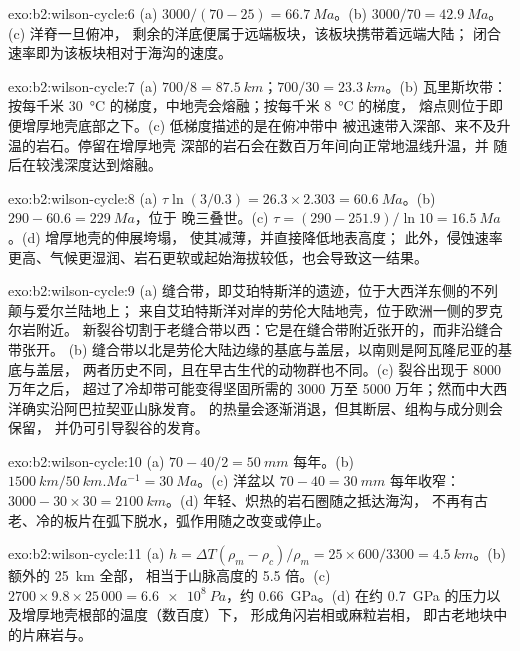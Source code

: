 \begin{solution}{exo:b2:wilson-cycle:6}
(a) $3000/(70 - 25) = \qty{66.7}{Ma}$。(b) $3000/70 = \qty{42.9}{Ma}$。(c) 洋脊一旦俯冲，
剩余的洋底便属于远端板块，该板块携带着远端大陆；
闭合速率即为该板块相对于海沟的速度。
\end{solution}

\begin{solution}{exo:b2:wilson-cycle:7}
(a) $700/8 = \qty{87.5}{km}$；$700/30 = \qty{23.3}{km}$。(b) 瓦里斯坎带：
按每千米 \qty{30}{\celsius} 的梯度，中地壳会熔融；按每千米 \qty{8}{\celsius} 的梯度，
熔点则位于即便增厚地壳底部之下。(c) 低梯度描述的是在俯冲带中
被迅速带入深部、来不及升温的岩石。停留在增厚地壳
深部的岩石会在数百万年间向正常地温线升温，并
随后在较浅深度达到熔融。
\end{solution}

\begin{solution}{exo:b2:wilson-cycle:8}
(a) $\tau\ln(3/0.3) = 26.3\times2.303 = \qty{60.6}{Ma}$。(b) $290 - 60.6 = \qty{229}{Ma}$，位于
晚三叠世。(c) $\tau = (290 - 251.9)/\ln10 = \qty{16.5}{Ma}$。(d) 增厚地壳的伸展垮塌，
使其减薄，并直接降低地表高度；
此外，侵蚀速率更高、气候更湿润、岩石更软或起始海拔较低，也会导致这一结果。
\end{solution}

\begin{solution}{exo:b2:wilson-cycle:9}
(a) 缝合带，即艾珀特斯洋的遗迹，位于大西洋东侧的不列颠与爱尔兰陆地上；
来自艾珀特斯洋对岸的劳伦大陆地壳，位于欧洲一侧的罗克尔岩附近。
新裂谷切割于老缝合带以西：它是在缝合带附近张开的，而非沿缝合带张开。
(b) 缝合带以北是劳伦大陆边缘的基底与盖层，以南则是阿瓦隆尼亚的基底与盖层，
两者历史不同，且在早古生代的动物群也不同。(c) 裂谷出现于 8000 万年之后，
超过了冷却带可能变得坚固所需的 3000 万至 5000 万年；然而中大西洋确实沿阿巴拉契亚山脉发育。
的热量会逐渐消退，但其断层、组构与成分则会保留，
并仍可引导裂谷的发育。
\end{solution}

\begin{solution}{exo:b2:wilson-cycle:10}
(a) $70 - 40/2 = \qty{50}{mm}$ 每年。(b) $\qty{1500}{km}/\qty{50}{km.Ma^{-1}} =
\qty{30}{Ma}$。(c) 洋盆以 $70 - 40 = \qty{30}{mm}$ 每年收窄：$3000 - 30\times30 =
\qty{2100}{km}$。(d) 年轻、炽热的岩石圈随之抵达海沟，
不再有古老、冷的板片在弧下脱水，弧作用随之改变或停止。
\end{solution}

\begin{solution}{exo:b2:wilson-cycle:11}
(a) $h = \Delta T(\rho_m - \rho_c)/\rho_m = 25\times600/3300 = \qty{4.5}{km}$。(b) 额外的 \qty{25}{km} 全部，
相当于山脉高度的 5.5 倍。(c) $2700\times9.8\times25\,000 =
\qty{6.6e8}{Pa}$，约 \qty{0.66}{GPa}。(d) 在约 \qty{0.7}{GPa} 的压力以及增厚地壳根部的温度（数百度）下，
形成角闪岩相或麻粒岩相，
即古老地块中的片麻岩与。
\end{solution}

